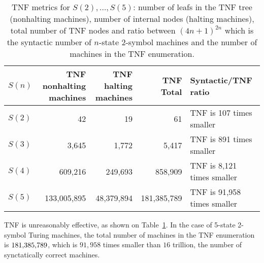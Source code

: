 \begin{table}[h!]
    \centering
    \begin{tabular}{|l|r|r|r|l|}
        \hline
        $S(n)$ & \makecell{TNF nonhalting                                                          \\ machines} & \makecell{TNF halting \\ machines} & TNF Total         & Syntactic/TNF ratio                 \\
        \hline
        $S(2)$ & 42                       & 19         & 61          & TNF is 107 times smaller    \\
        $S(3)$ & 3,645                    & 1,772      & 5,417       & TNF is 891 times smaller    \\
        $S(4)$ & 609,216                  & 249,693    & 858,909     & TNF is 8,121 times smaller  \\
        $S(5)$ & 133,005,895              & 48,379,894 & 181,385,789 & TNF is 91,958 times smaller \\
        \hline
    \end{tabular}

    \caption{TNF metrics for $S(2),\dots,S(5)$: number of leafs in the TNF tree (nonhalting machines), number of internal nodes (halting machines), total number of TNF nodes and ratio between $(4n+1)^{2n}$ which is the syntactic number of $n$-state 2-symbol machines and the number of machines in the TNF enumeration.}\label{tab:TNF-numbers}
\end{table}

TNF is unreasonably effective, as shown on Table~\ref{tab:TNF-numbers}. In the case of 5-state 2-symbol Turing machines, the total number of machines in the TNF enumeration is $181{,}385{,}789$, which is $91{,}958$ times smaller than $16$ trillion, the number of synctatically correct machines.

